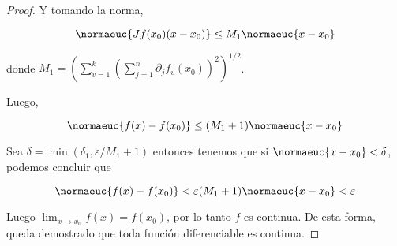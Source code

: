\begin{proof}
    Y tomando la norma,
    
    \[
    \normaeuc{Jf(x_0)(x-x_0)} \leq M_1\normaeuc{x-x_0}
    \]
    
    \noindent donde $\displaystyle M_1 = \left( \sum_{v = 1}^k \left( \sum_{j=1}^n \partial_j f_v(x_0) \right)^2 \right)^{1/2}$.
    
    Luego,
    
    \[
    \normaeuc{f(x) - f(x_0)} \leq (M_1 + 1)\normaeuc{x - x_0}
    \]
    
    Sea $\delta = \min(\delta_1, \varepsilon / M_1 + 1)$ entonces tenemos que si $\normaeuc{x - x_0} < \delta$, podemos concluir que
    
    \[
    \normaeuc{f(x) - f(x_0)} < \varepsilon(M_1 + 1)\normaeuc{x - x_0} < \varepsilon
    \]
    
    Luego $\lim_{x \to x_0} f(x) = f(x_0)$, por lo tanto $f$ es continua. De esta forma, queda demostrado que toda función diferenciable es continua.
\end{proof}